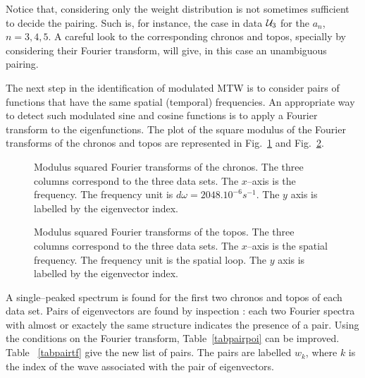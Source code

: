 Notice that, considering  only the weight distribution is not
sometimes sufficient to decide the pairing. Such is, for instance,
the case in data ${\cal U}_3$ for the $a_n$, $n=3,4,5$. A careful look
to the corresponding chronos and topos, specially by considering
their Fourier transform, will give, in this case an
unambiguous pairing.

The next step in the identification of modulated MTW is to consider pairs
of functions that have the same spatial (temporal) frequencies. 
An appropriate way to detect such modulated sine and cosine functions
is to apply a Fourier transform to the eigenfunctions.
The plot of the square modulus of the Fourier transforms of the
chronos and topos are represented in Fig.~\ref{bodfftc} and
Fig.~\ref{bodfftt}.

\begin{figure}
\centering
{}
\caption{Modulus squared Fourier transforms of the chronos. 
The three columns correspond to the three data sets. 
The $x$--axis is the frequency. The frequency unit is 
$d\omega=2048.10^{-6}s^{-1}$. The $y$ axis is labelled 
by the eigenvector index. }
\label{bodfftc}
\end{figure}


\begin{figure}
\centering
{}
\caption{Modulus squared Fourier transforms of the topos. 
The three columns correspond to the three data sets. 
The $x$--axis is the spatial frequency. The frequency unit is 
the spatial loop. The $y$ axis is labelled 
by the eigenvector index.}
\label{bodfftt}
\end{figure}

A single--peaked spectrum is found for the first two chronos and topos
of each data set. Pairs of eigenvectors are found by  inspection :
each two Fourier spectra with almost or exactely the same
structure indicates the presence of a pair. Using the conditions
on the Fourier transform, Table~\ref{tabpairpoi} can be improved.
Table ~\ref{tabpairtf} give the new list of pairs. The
pairs are labelled $w_k$, where $k$ is the index of the wave associated
with the pair of eigenvectors.


